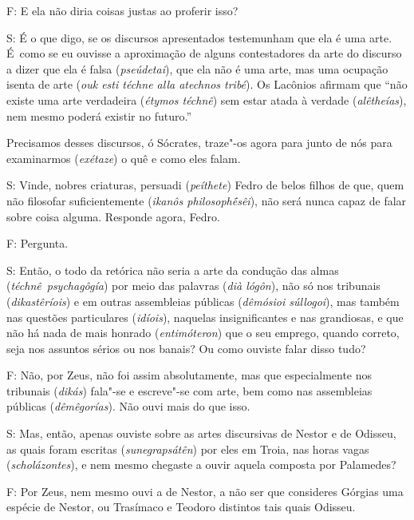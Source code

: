 \bekker{[260e]} F: E ela não diria coisas justas ao proferir isso?

S: É o que digo, se os discursos apresentados testemunham que ela é uma
arte. É~como se eu ouvisse a aproximação de alguns contestadores da arte
do discurso a dizer que ela é falsa (\emph{pseúdetai}), que ela não é
uma arte, mas uma ocupação isenta de arte (\emph{ouk esti téchne alla
atechnos tribé}). Os Lacônios afirmam que ``não existe uma arte
verdadeira (\emph{étymos téchnê}) sem estar atada à verdade
(\emph{alêtheías}), nem mesmo poderá existir no futuro.''

\bekker{[261a]} Precisamos desses discursos, ó Sócrates, traze"-os agora para
junto de nós para examinarmos (\emph{exétaze}) o quê e como eles falam.

S: Vinde, nobres criaturas, persuadi (\emph{peíthete}) Fedro de belos
filhos de que, quem não filosofar suficientemente (\emph{ikanôs
philosophḗsêi}), não será nunca capaz de falar sobre coisa alguma.
Responde agora, Fedro.

F: Pergunta.

S: Então, o todo da retórica não seria a arte da condução das almas
(\emph{téchnê}~\emph{psychagôgía}) por meio das palavras (\emph{dià
lógôn}), não só nos tribunais (\emph{dikastêríois}) e em outras
assembleias públicas (\emph{dêmósioi súllogoi}), mas também nas questões
particulares (\emph{idíois}), naquelas insignificantes e nas grandiosas,
e que não há nada de mais honrado (\emph{entimóteron}) que o seu
emprego, quando correto, seja nos assuntos sérios ou nos banais?
\bekker{[261b]} Ou como ouviste falar disso tudo?

F: Não, por Zeus, não foi assim absolutamente, mas que especialmente nos
tribunais (\emph{dikás}) fala"-se e escreve"-se com arte, bem como nas
assembleias públicas (\emph{dêmêgorías}). Não ouvi mais do que isso.

S: Mas, então, apenas ouviste sobre as artes discursivas de Nestor e de
Odisseu, as quais foram escritas (\emph{sunegrapsátên}) por eles em
Troia, nas horas vagas (\emph{scholázontes}), e nem mesmo chegaste a
ouvir aquela composta por Palamedes?

\bekker{[261c]} F: Por Zeus, nem mesmo ouvi a de Nestor, a não ser que
consideres Górgias uma espécie de Nestor, ou Trasímaco e Teodoro
distintos tais quais Odisseu.

